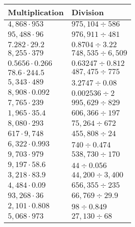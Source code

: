\begin{longtable}[]{@{}ll@{}}
\toprule
Multiplication & Division\tabularnewline
\midrule
\endhead
\(4,868\cdot953\) & \(975,104÷586\)\tabularnewline
\(95,488\cdot96\) & \(976,911÷481\)\tabularnewline
\(7.282\cdot29.2\) & \(0.8704÷3.22\)\tabularnewline
\(8,255\cdot379\) & \(748,535÷6,509\)\tabularnewline
\(0.5656\cdot0.266\) & \(0.63247÷0.812\)\tabularnewline
\(78.6\cdot244.5\) & \(487,475÷775\)\tabularnewline
\(5,343\cdot489\) & \(3.2747÷0.08\)\tabularnewline
\(8,908\cdot0.092\) & \(0.002536÷2\)\tabularnewline
\(7,765\cdot239\) & \(995,629÷829\)\tabularnewline
\(1,965\cdot35.4\) & \(606,366÷197\)\tabularnewline
\(8,080\cdot293\) & \(75,264÷672\)\tabularnewline
\(617\cdot9,748\) & \(455,808÷24\)\tabularnewline
\(6,322\cdot0.993\) & \(740÷0.474\)\tabularnewline
\(9,703\cdot979\) & \(538,730÷170\)\tabularnewline
\(9,197\cdot58.6\) & \(44÷0.056\)\tabularnewline
\(3,218\cdot83.9\) & \(44,200÷3,400\)\tabularnewline
\(4,484\cdot0.09\) & \(656,355÷235\)\tabularnewline
\(93,268\cdot36\) & \(66,769÷29.9\)\tabularnewline
\(2,101\cdot0.808\) & \(98÷0.849\)\tabularnewline
\(5,068\cdot973\) & \(27,130÷68\)\tabularnewline
\bottomrule
\end{longtable}
